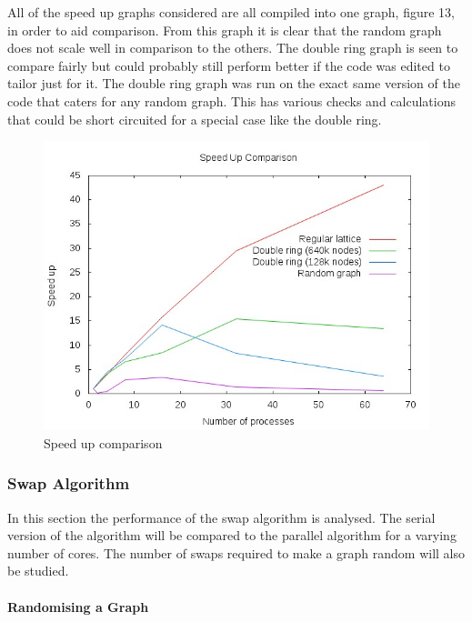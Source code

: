 \documentclass[pdftex,12pt,a4paper]{article}
\begin{document}
All of the speed up graphs considered are all compiled into one graph, figure 13, in order to aid comparison. From this graph it is clear that the random graph does not scale well in comparison to the others. The double ring graph is seen to compare fairly but could probably still perform better if the code was edited to tailor just for it. The double ring graph was run on the exact same version of the code that caters for any random graph. This has various checks and calculations that could be short circuited for a special case like the double ring.


\begin{figure}
\centering
\includegraphics[scale=0.8]{comp3.jpg}
\caption{Speed up comparison}
\end{figure}




\subsubsection{Swap Algorithm}

In this section the performance of the swap algorithm is analysed. The serial version of the algorithm will be compared to the parallel algorithm for a varying number of cores. The number of swaps required to make a graph random will also be studied.

\paragraph{Randomising a Graph} ~\\
\end{document}
